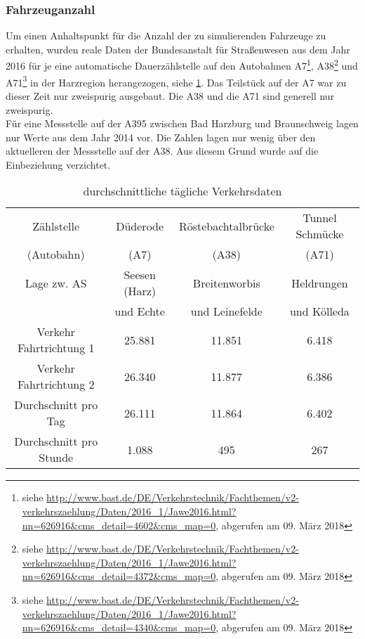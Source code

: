 \subsubsection{Fahrzeuganzahl}
\label{sec:fahrzeuganzahl}

Um einen Anhaltspunkt für die Anzahl der zu simulierenden Fahrzeuge zu erhalten, wurden reale Daten der Bundesanstalt für Straßenwesen aus dem Jahr 2016 für je eine automatische Dauerzählstelle auf den Autobahnen A7\footnote{siehe \url{http://www.bast.de/DE/Verkehrstechnik/Fachthemen/v2-verkehrszaehlung/Daten/2016_1/Jawe2016.html?nn=626916&cms_detail=4602&cms_map=0}, abgerufen am 09. März 2018}, A38\footnote{siehe \url{http://www.bast.de/DE/Verkehrstechnik/Fachthemen/v2-verkehrszaehlung/Daten/2016_1/Jawe2016.html?nn=626916&cms_detail=4372&cms_map=0}, abgerufen am 09. März 2018} und A71\footnote{siehe \url{http://www.bast.de/DE/Verkehrstechnik/Fachthemen/v2-verkehrszaehlung/Daten/2016_1/Jawe2016.html?nn=626916&cms_detail=4340&cms_map=0}, abgerufen am 09. März 2018} in der Harzregion herangezogen, siehe \cref{tab:reale-verkehrsdaten}. 
Das Teilstück auf der A7 war zu dieser Zeit nur zweispurig ausgebaut. 
Die A38 und die A71 sind generell nur zweispurig.
\\
Für eine Messstelle auf der A395 zwischen Bad Harzburg und Braunschweig lagen nur Werte aus dem Jahr 2014 vor.
Die Zahlen lagen nur wenig über den aktuelleren der Messstelle auf der A38.
Aus diesem Grund wurde auf die Einbeziehung verzichtet.


\begin{table}[hptb]
\begin{center}
\setlength{\tabcolsep}{0.5em} %
{\renewcommand{\arraystretch}{1.2}%
\begin{tabular}{| c  c  c  c |}
\hline 
Zählstelle & Düderode & Röstebachtalbrücke & Tunnel Schmücke \\
(Autobahn) & (A7) & (A38) & (A71) \\
\hline 
Lage zw. AS & Seesen (Harz) & Breitenworbis & Heldrungen \\
 & und Echte & und Leinefelde & und Kölleda \\
\hline 
Verkehr Fahrtrichtung 1 & 25.881 & 11.851 & 6.418 \\ 
\hline 
Verkehr Fahrtrichtung 2 & 26.340 & 11.877 & 6.386 \\ 
\hline 
Durchschnitt pro Tag & 26.111 & 11.864 & 6.402 \\ 
\hline 
Durchschnitt pro Stunde & 1.088 & 495 & 267 \\ \hline
\end{tabular}
}
\caption{durchschnittliche tägliche Verkehrsdaten}
\label{tab:reale-verkehrsdaten}
\end{center}
\end{table}

